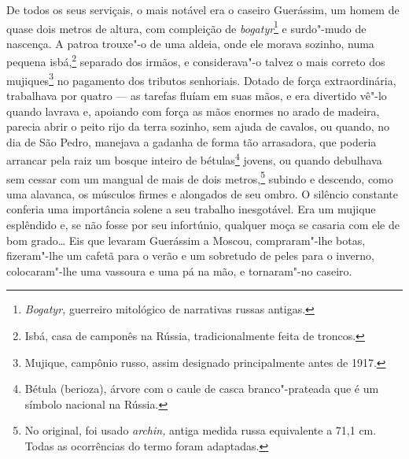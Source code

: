 De todos os seus serviçais, o mais notável era o caseiro Guerássim, um
homem de quase dois metros de altura, com compleição de
\emph{bogatyr}\footnote{\emph{Bogatyr,} guerreiro mitológico de
  narrativas russas antigas.} e surdo"-mudo de nascença. A patroa
trouxe"-o de uma aldeia, onde ele morava sozinho, numa pequena
isbá,\footnote{Isbá, casa de camponês na Rússia, tradicionalmente
  feita de troncos.} separado dos irmãos, e considerava"-o talvez o mais
correto dos mujiques\footnote{Mujique, campônio russo, assim designado
  principalmente antes de 1917.} no pagamento dos tributos senhoriais.
Dotado de força extraordinária, trabalhava por quatro --- as tarefas
fluíam em suas mãos, e era divertido vê"-lo quando lavrava e, apoiando
com força as mãos enormes no arado de madeira, parecia abrir o peito
rijo da terra sozinho, sem ajuda de cavalos, ou quando, no dia de São
Pedro, manejava a gadanha de forma tão arrasadora, que poderia arrancar
pela raiz um bosque inteiro de bétulas\footnote{Bétula (berioza), árvore
  com o caule de casca branco"-prateada que é um símbolo nacional na
  Rússia.} jovens, ou quando debulhava sem cessar com um mangual de mais
de dois metros,\footnote{No original, foi usado \emph{archin,} antiga
  medida russa equivalente a 71,1 cm. Todas as ocorrências do termo
  foram adaptadas.} subindo e descendo, como uma alavanca, os músculos
firmes e alongados de seu ombro. O silêncio constante conferia uma
importância solene a seu trabalho inesgotável. Era um mujique esplêndido
e, se não fosse por seu infortúnio, qualquer moça se casaria com ele de
bom grado\ldots{} Eis que levaram Guerássim a Moscou, compraram"-lhe botas,
fizeram"-lhe um cafetã para o verão e um sobretudo de peles para o
inverno, colocaram"-lhe uma vassoura e uma pá na mão, e tornaram"-no
caseiro.

